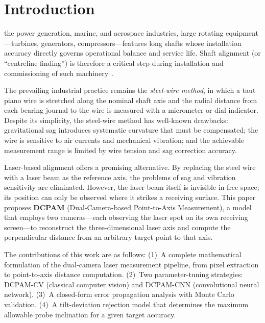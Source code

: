 \section{Introduction}

 the power generation, marine, and aerospace
industries, large rotating equipment---turbines, generators,
compressors---features long shafts whose installation accuracy
directly governs operational balance and service life.
%
Shaft alignment (or ``centreline finding'') is therefore a
critical step during installation and commissioning of such
machinery~\cite{piotrowski2006shaft}.

The prevailing industrial practice remains the
\emph{steel-wire method}, in which a taut piano wire is
stretched along the nominal shaft axis and the radial distance
from each bearing journal to the wire is measured with a
micrometer or dial indicator.
%
Despite its simplicity, the steel-wire method has well-known
drawbacks:
gravitational sag introduces systematic curvature
that must be compensated;
the wire is sensitive to air currents and mechanical vibration;
and the achievable measurement range is limited by wire tension
and sag correction accuracy.

Laser-based alignment offers a promising alternative.
%
By replacing the steel wire with a laser beam as the reference
axis, the problems of sag and vibration sensitivity are
eliminated.
%
However, the laser beam itself is invisible in free space;
its position can only be observed where it strikes a
receiving surface.
%
This paper proposes \textbf{DCPAM}
(Dual-Camera-based Point-to-Axis Measurement),
a model that employs two cameras---each observing the laser
spot on its own receiving screen---to reconstruct the
three-dimensional laser axis and compute the perpendicular
distance from an arbitrary target point to that axis.

The contributions of this work are as follows:
%
(1)~A complete mathematical formulation of the dual-camera
laser measurement pipeline, from pixel extraction to
point-to-axis distance computation.
%
(2)~Two parameter-tuning strategies:
DCPAM-CV (classical computer vision) and
DCPAM-CNN (convolutional neural network).
%
(3)~A closed-form error propagation analysis with
Monte Carlo validation.
%
(4)~A tilt-deviation rejection model that determines
the maximum allowable probe inclination for a given
target accuracy.

